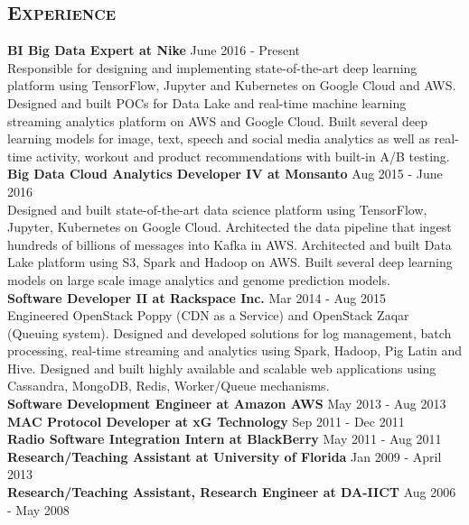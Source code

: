 \begin{resume}
\section{\textsc{Experience}}
\textbf{BI Big Data Expert at Nike} \hfill June 2016 - Present\\
Responsible for designing and implementing state-of-the-art deep learning platform using TensorFlow, Jupyter and Kubernetes on Google Cloud and AWS. Designed and built POCs for Data Lake and real-time machine learning streaming analytics platform on AWS and Google Cloud. Built several deep learning models for image, text, speech and social media analytics as well as real-time activity, workout and product recommendations with built-in A/B testing.\\
\textbf{Big Data Cloud Analytics Developer IV at Monsanto} \hfill Aug 2015 - June 2016\\
Designed and built state-of-the-art data science platform using TensorFlow, Jupyter, Kubernetes on Google Cloud. Architected the data pipeline that ingest hundreds of billions of messages into Kafka in AWS. Architected and built Data Lake platform using S3, Spark and Hadoop on AWS. Built several deep learning models on large scale image analytics and genome prediction models.\\
\textbf{Software Developer II at Rackspace Inc.} \hfill Mar 2014 - Aug 2015\\
Engineered OpenStack Poppy (CDN as a Service) and OpenStack Zaqar (Queuing system). Designed and developed solutions for log management, batch processing, real-time streaming and analytics using Spark, Hadoop, Pig Latin and Hive. Designed and built highly available and scalable web applications using Cassandra, MongoDB, Redis, Worker/Queue mechanisms.\\
\textbf{Software Development Engineer at Amazon AWS} \hfill May 2013 - Aug 2013\\
\textbf{MAC Protocol Developer at xG Technology} \hfill Sep 2011 - Dec 2011\\
\textbf{Radio Software Integration Intern at BlackBerry} \hfill May 2011 - Aug 2011\\
\textbf{Research/Teaching Assistant at University of Florida} \hfill Jan 2009 - April 2013\\
\textbf{Research/Teaching Assistant, Research Engineer at DA-IICT} \hfill Aug 2006 - May 2008

\begin{formatb}
  \\
  \body\\
\end{formatb}


\end{resume}
